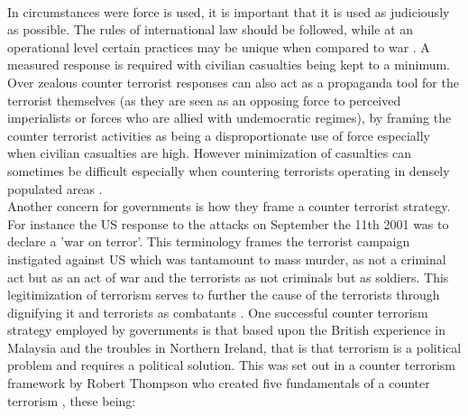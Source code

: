 \\
In circumstances were force is used, it is important that it is used as judiciously as possible. The rules of international law should be followed, while at an operational level certain practices may be unique when compared to war \citep{roberts2002counter}. A measured response is required with civilian casualties being kept to a minimum. Over zealous counter terrorist responses can also act as a propaganda tool for the terrorist themselves (as they are seen as an opposing force to perceived imperialists or forces who are allied with undemocratic regimes), by framing the counter terrorist activities as being a disproportionate use of force especially when civilian casualties are high. However minimization of casualties can sometimes be difficult especially when countering terrorists operating in densely populated areas \citep{graham2009urban}.  
\\
Another concern for governments is how they frame a counter terrorist strategy. For instance the US response to the attacks on September the 11th 2001 was to declare a 'war on terror'. This terminology frames the terrorist campaign instigated against US which was tantamount to mass murder, as not a criminal act but as an act of war and the terrorists as not criminals but as soldiers. This legitimization of terrorism serves to further the cause of the terrorists through dignifying it and terrorists as combatants \citep{moeller2009packaging}. One successful counter terrorism  strategy employed by governments is that based upon the British experience in Malaysia and the troubles in Northern Ireland, that is that terrorism is a political problem and requires a political solution. This was set out in a counter terrorism framework by Robert Thompson \citep{hamilton1998art} who created five fundamentals of a counter terrorism \citep{thompson1966defeating}, these being:
